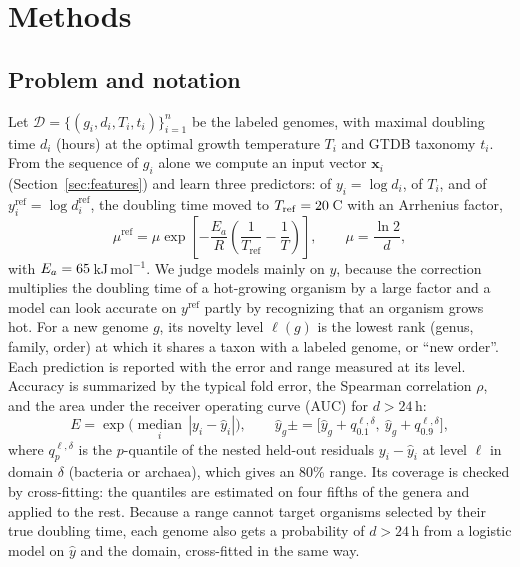 \section{Methods}

\subsection{Problem and notation}
Let $\mathcal{D}=\{(g_i,d_i,T_i,t_i)\}_{i=1}^{n}$ be the labeled genomes, with maximal doubling time $d_i$ (hours) at the
optimal growth temperature $T_i$ and GTDB taxonomy $t_i$. From the sequence of $g_i$ alone we compute an input vector
$\mathbf{x}_i$ (Section~\ref{sec:features}) and learn three predictors: of $y_i=\log d_i$, of $T_i$, and of
$y^{\mathrm{ref}}_i=\log d^{\mathrm{ref}}_i$, the doubling time moved to $T_{\mathrm{ref}}=20$\,\textdegree C with an
Arrhenius factor,
\begin{equation}
\mu^{\mathrm{ref}}=\mu\exp\!\left[-\frac{E_a}{R}\left(\frac{1}{T_{\mathrm{ref}}}-\frac{1}{T}\right)\right],\qquad \mu=\frac{\ln 2}{d},
\end{equation}
with $E_a=65$\,kJ\,mol$^{-1}$. We judge models mainly on $y$, because the correction multiplies the doubling time of a
hot-growing organism by a large factor and a model can look accurate on $y^{\mathrm{ref}}$ partly by recognizing that an
organism grows hot. For a new genome $g$, its novelty level $\ell(g)$ is the lowest rank (genus, family, order) at which
it shares a taxon with a labeled genome, or ``new order''. Each prediction is reported with the error and range measured
at its level. Accuracy is summarized by the typical fold error, the Spearman correlation $\rho$, and the area under the
receiver operating curve (AUC) for $d>24$\,h:
\begin{equation}
E=\exp\Big(\operatorname*{median}_i\,|y_i-\hat y_i|\Big),\qquad
\hat y_g\pm=\big[\hat y_g+q^{\ell,\delta}_{0.1},\ \hat y_g+q^{\ell,\delta}_{0.9}\big],
\label{eq:metrics}
\end{equation}
where $q^{\ell,\delta}_{p}$ is the $p$-quantile of the nested held-out residuals $y_i-\hat y_i$ at level $\ell$ in
domain $\delta$ (bacteria or archaea), which gives an 80\% range. Its coverage is checked by cross-fitting: the quantiles
are estimated on four fifths of the genera and applied to the rest. Because a range cannot target organisms selected by
their true doubling time, each genome also gets a probability of $d>24$\,h from a logistic model on $\hat y$ and the
domain, cross-fitted in the same way.

